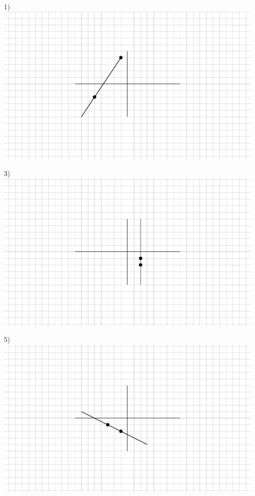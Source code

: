 {}
\label{lineargraphs1}
\begin{multicols}{2}
  1)\\
	\includegraphics[scale=.8,bb = 115 65 310 190, clip=true]{II_1_3cp-1.eps}
  
  3)\\
	\includegraphics[scale=.8,bb = 115 65 310 190, clip=true]{II_1_3cp-2.eps}
  
  
  
  
  
  5)\\
	\includegraphics[scale=.8,bb = 115 65 310 190, clip=true]{II_1_3cp-6.eps}
  

\end{multicols}
